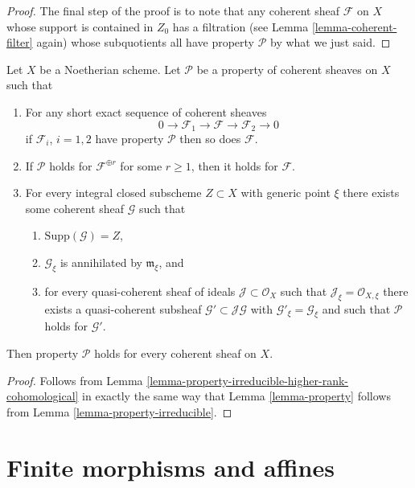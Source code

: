 \begin{proof}
\medskip\noindent
The final step of the proof is to note that any coherent sheaf
$\mathcal{F}$ on $X$ whose support is contained in $Z_0$ has a filtration
(see Lemma \ref{lemma-coherent-filter} again) whose subquotients
all have property $\mathcal{P}$ by what we just said.
\end{proof}

\begin{lemma}
\label{lemma-property-higher-rank-cohomological}
Let $X$ be a Noetherian scheme.
Let $\mathcal{P}$ be a property of coherent sheaves on $X$ such that
\begin{enumerate}
\item For any short exact sequence of coherent sheaves
$$
0 \to \mathcal{F}_1 \to \mathcal{F} \to \mathcal{F}_2 \to 0
$$
if $\mathcal{F}_i$, $i = 1, 2$ have property $\mathcal{P}$
then so does $\mathcal{F}$.
\item If $\mathcal{P}$ holds  for $\mathcal{F}^{\oplus r}$ for
some $r \geq 1$, then it holds for $\mathcal{F}$.
\item For every integral closed subscheme $Z \subset X$
with generic point $\xi$ there exists
some coherent sheaf $\mathcal{G}$ such that
\begin{enumerate}
\item $\text{Supp}(\mathcal{G}) = Z$,
\item $\mathcal{G}_\xi$ is annihilated by $\mathfrak m_\xi$, and
\item for every quasi-coherent sheaf of ideals
$\mathcal{J} \subset \mathcal{O}_X$ such that
$\mathcal{J}_\xi = \mathcal{O}_{X, \xi}$ there exists a quasi-coherent
subsheaf $\mathcal{G}' \subset \mathcal{J}\mathcal{G}$ with
$\mathcal{G}'_\xi = \mathcal{G}_\xi$ and such that
$\mathcal{P}$ holds for $\mathcal{G}'$.
\end{enumerate}
\end{enumerate}
Then property $\mathcal{P}$ holds for every coherent sheaf
on $X$.
\end{lemma}

\begin{proof}
Follows from Lemma \ref{lemma-property-irreducible-higher-rank-cohomological}
in exactly the same way that Lemma \ref{lemma-property} follows from
Lemma \ref{lemma-property-irreducible}.
\end{proof}








\section{Finite morphisms and affines}
\label{section-finite-affine}

